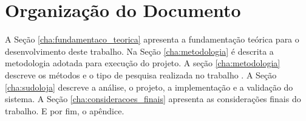 \documentclass[a4paper,12pt]{monografia}
\begin{document}

\section{Organização do Documento} %
\label{sec:organizacao_do_documento}

A Seção \ref{cha:fundamentaco_teorica} apresenta a fundamentação teórica para o desenvolvimento deste trabalho. Na Seção \ref{cha:metodologia} é descrita a metodologia adotada para execução do projeto. A seção \ref{cha:metodologia} descreve os métodos e o tipo de pesquisa realizada no trabalho . A Seção \ref{cha:sudoloja} descreve a análise, o projeto, a implementação e a validação do sistema. A Seção \ref{cha:consideracoes_finais} apresenta as considerações finais do trabalho. E por fim, o apêndice.




\end{document}
